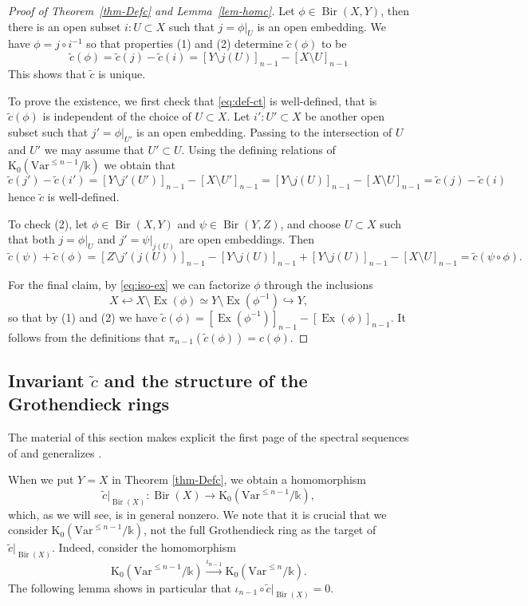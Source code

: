 \documentclass[a4paper,12pt]{amsart}
\def\k{\mathbb k}
\def\Bir{{\operatorname{Bir}}}
\def\Ex{{\operatorname{Ex}}}
\def\Kt{{\mathrm{K}}}
\def\Var{{\mathrm{Var}}}
\theoremstyle{plain}
\numberwithin{equation}{section}
\theoremstyle{definition}
\newcommand{\ti}[1]{\tilde{#1}}
\renewcommand{\(}{\left(}
\renewcommand{\)}{\right)}
\newcommand{\hto}{\hookrightarrow}
\newcommand{\hlto}{\hookleftarrow}
\begin{document}
\begin{proof}[Proof of Theorem~\ref{thm-Defc} and
Lemma~\ref{lem-homc}]

Let $\phi \in \Bir(X, Y)$, then there is an open subset $i: U \subset X$
such that $j = \phi|_U$ is an open embedding. We have $\phi = j \circ i^{-1}$
so that properties (1) and (2) determine $\ti{c}(\phi)$ to be
\begin{equation}\label{eq:def-ct}
    \ti{c}(\phi) = \ti{c}(j) - \ti{c}(i) = [Y \setminus j(U)]_{n-1} - [X \setminus U]_{n-1}
\end{equation}
This shows that $\ti{c}$ is unique. 

To prove the existence,
we first check that \eqref{eq:def-ct} is well-defined, that is $\ti{c}(\phi)$
is independent of
the choice of $U \subset X$. Let $i': U' \subset X$ be another open subset
such that $j' = \phi|_{U'}$ is an open embedding.
Passing to the intersection of 
$U$ and $U'$ we may assume that $U' \subset U$.
Using the defining relations of $\Kt_0(\Var^{\le n-1}/\k)$
we obtain that
\[
\ti{c}(j') - \ti{c}(i') = [Y \setminus j'(U')]_{n-1} - [X \setminus U']_{n-1} = 
[Y \setminus j(U)]_{n-1} - [X \setminus U]_{n-1} = 
\ti{c}(j) - \ti{c}(i)
\]
hence $\ti{c}$ is well-defined.

To check (2), let $\phi \in \Bir(X, Y)$ and $\psi \in \Bir(Y,Z)$,
and choose $U \subset X$ such that both $j = \phi|_U$ and 
$j'= \psi|_{j(U)}$ are open embeddings. Then
$$\ti{c}(\psi) + \ti{c}(\phi)
= [Z \setminus j'(j(U))]_{n-1} - [Y \setminus j(U)]_{n-1}  +
[Y \setminus j(U)]_{n-1} - [X \setminus U]_{n-1} = \ti{c}(\psi 
\circ \phi).$$

For the final claim, by \eqref{eq:iso-ex} we can factorize $\phi$ through
the inclusions
\[
X \hlto X \setminus \Ex(\phi) \simeq Y \setminus \Ex(\phi^{-1}) \hto Y,
\]
so that by (1) and (2) we have
$\ti{c}(\phi) = [\Ex(\phi^{-1})]_{n-1} - [\Ex(\phi)]_{n-1}$.
It follows from the definitions that $\pi_{n-1}(\ti{c}(\phi)) = c(\phi)$. 
\end{proof}

\subsection{Invariant $\ti{c}$ and
the structure of the Grothendieck rings}
\hfill

The material of this section makes explicit
the first page of
the spectral sequences of
\cite[Section 3]{Zakharevich}
and generalizes \cite[\S 3.2]{LSZ20}.

When we put
$Y = X$ in Theorem 
\ref{thm-Defc},
we obtain a homomorphism
\begin{equation}\label{wtc-BirX}
\ti{c}|_{\Bir(X)} : \Bir(X) \to \Kt_0(\Var^{\le{n-1}}/\k),
\end{equation}
which, as we will see, 
is in general nonzero.
We note that it is crucial that we consider
$\Kt_0(\Var^{\le n-1}/\k)$, not the full Grothendieck
ring as the target of $\ti{c}|_{\Bir(X)}$.
Indeed, consider the homomorphism
\begin{equation}\label{eq:iota}
\Kt_0(\Var^{\le n-1}/\k) \overset{\iota_{n-1}}\to \Kt_0(\Var^{\le n}/\k).
\end{equation}
The following lemma shows in particular
that $\iota_{n-1} \circ \ti{c}|_{\Bir(X)} = 0$.
\end{document}
